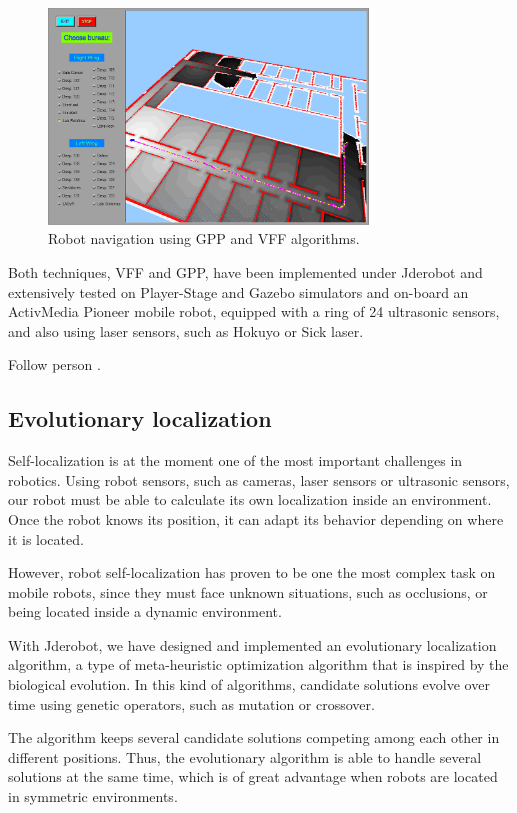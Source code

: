 \documentclass[twocolumn]{svjour3}          %
\begin{document}
\begin{figure}[h!]
  \includegraphics[width=8.5cm]{figs/gppNav.png}
\caption{Robot navigation using GPP and VFF algorithms.}
\label{fig:gppNav}
\end{figure}

Both techniques, VFF and GPP, have been implemented under Jderobot and extensively tested on Player-Stage and Gazebo simulators and on-board an ActivMedia Pioneer mobile robot, equipped with a ring of 24 ultrasonic sensors, and also using laser sensors, such as Hokuyo or Sick laser.

Follow person \cite{canas05d}.

\subsection{Evolutionary localization}

Self-localization is at the moment one of the most important challenges in robotics. Using robot sensors, such as cameras, laser sensors or ultrasonic sensors, our robot must be able to calculate its own localization inside an environment. Once the robot knows its position, it can adapt its behavior depending on where it is located. 
 
However, robot self-localization has proven to be one the most complex task on mobile robots, since they must face unknown situations, such as occlusions, or being located inside a dynamic environment.

With Jderobot, we have designed and implemented an evolutionary localization algorithm, a type of meta-heuristic optimization algorithm that is inspired by the biological evolution. In this kind of algorithms, candidate solutions evolve over time using genetic operators, such as mutation or crossover. 

The algorithm keeps several candidate solutions competing among each other in different positions. Thus, the evolutionary algorithm is able to handle several solutions at the same time, which is of great advantage when robots are located in symmetric environments.  
\end{document}
